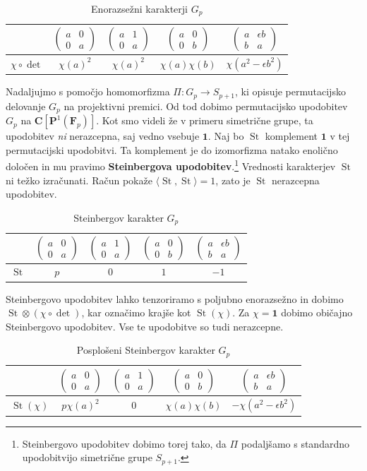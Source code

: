 \documentclass[11pt]{book}
\def\CC{\mathbf{C}}
\def\oneone{\mathbf{1}}
\def\FF{\mathbf{F}}
\def\PP{\mathbf{P}}
\DeclareMathOperator\St{St}
\def\definicija{\color{rdeca}\bf}
\newcommand{\mat}[4]{\left(\begin{smallmatrix}#1&#2\\#3&#4\end{smallmatrix}\right)}
\theoremstyle{definition}
\theoremstyle{zgled}
\theoremstyle{zgledbrezstevilke}
\theoremstyle{odprtproblem}
\theoremstyle{domacanaloga}
\theoremstyle{izrek}
\begin{document}
\begin{table}[ht]
    \centering
\begin{tabular}{l|*{4}{c}}
    & 
    $\mat{a}{0}{0}{a}$
    &
    $\mat{a}{1}{0}{a}$
    &
    $\mat{a}{0}{0}{b}$
    &
    $\mat{a}{\epsilon b}{b}{a}$ \\ \hline
    $\chi \circ \det$ & $\chi(a)^2$ & $\chi(a)^2$ & $\chi(a) \chi(b)$ & $\chi(a^2 - \epsilon b^2)$ \\
\end{tabular}
\caption{Enorazsežni karakterji $G_p$}
\end{table}

Nadaljujmo s pomočjo homomorfizma $\Pi \colon G_p \to S_{p+1}$, ki opisuje permutacijsko delovanje $G_p$ na projektivni premici. Od tod dobimo permutacijsko upodobitev $G_p$ na $\CC[\PP^1(\FF_p)]$. Kot smo videli že v primeru simetrične grupe, ta upodobitev \emph{ni} nerazcepna, saj vedno vsebuje $\oneone$. Naj bo $\St$ komplement $\oneone$ v tej permutacijski upodobitvi. Ta komplement je do izomorfizma natako enolično določen in mu pravimo {\definicija Steinbergova upodobitev}.\footnote{Steinbergovo upodobitev dobimo torej tako, da $\Pi$ podaljšamo s standardno upodobitvijo simetrične grupe $S_{p+1}$.} Vrednosti karakterjev $\St$ ni težko izračunati. Račun pokaže $\langle \St, \St \rangle = 1$, zato je $\St$ nerazcepna upodobitev.

\begin{table}[ht]
    \centering
\begin{tabular}{l|*{4}{c}}
    & 
    $\mat{a}{0}{0}{a}$
    &
    $\mat{a}{1}{0}{a}$
    &
    $\mat{a}{0}{0}{b}$
    &
    $\mat{a}{\epsilon b}{b}{a}$ \\ \hline
    $\St$ & $p$ & $0$ & $1$ & $-1$ \\
\end{tabular}
\caption{Steinbergov karakter $G_p$}
\end{table}

Steinbergovo upodobitev lahko tenzoriramo s poljubno enorazsežno in dobimo $\St \otimes (\chi \circ \det)$, kar označimo krajše kot $\St(\chi)$. Za $\chi = \oneone$ dobimo običajno Steinbergovo upodobitev. Vse te upodobitve so tudi nerazcepne.

\begin{table}[ht]
    \centering
\begin{tabular}{l|*{4}{c}}
    & 
    $\mat{a}{0}{0}{a}$
    &
    $\mat{a}{1}{0}{a}$
    &
    $\mat{a}{0}{0}{b}$
    &
    $\mat{a}{\epsilon b}{b}{a}$ \\ \hline
    $\St(\chi)$ & $p \chi(a)^2$ & $0$ & $\chi(a) \chi(b)$ & $- \chi(a^2 - \epsilon b^2)$ \\
\end{tabular}
\caption{Posplošeni Steinbergov karakter $G_p$}
\end{table}
\end{document}
